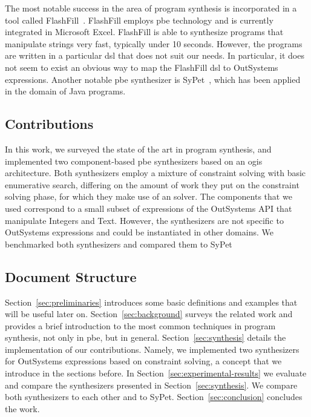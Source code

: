 The most notable success in the area of program synthesis is incorporated in a
tool called FlashFill~\cite{Gulwani:2011}.
FlashFill employs \gls{pbe} technology and is currently integrated in Microsoft
Excel.
FlashFill is able to synthesize programs that manipulate strings very fast,
typically under 10 seconds.
However, the programs are written in a particular \gls{dsl} that does not suit
our needs.
In particular, it does not seem to exist an obvious way to map the FlashFill
\gls{dsl} to OutSystems expressions.
Another notable \gls{pbe} synthesizer is SyPet~\cite{Feng:2017:CSC}, which has
been applied in the domain of Java programs.

\subsection{Contributions}

In this work, we surveyed the state of the art in program synthesis, and
implemented two component-based \gls{pbe} synthesizers based on an \gls{ogis}
architecture.
Both synthesizers employ a mixture of constraint solving with basic enumerative
search, differing on the amount of work they put on the constraint solving
phase, for which they make use of an  solver.
The components that we used correspond to a small subset of expressions of the
OutSystems API that manipulate Integers and Text.
However, the synthesizers are not specific to OutSystems expressions and could
be instantiated in other domains.
We benchmarked both synthesizers and compared them to SyPet~\cite{Feng:2017:CSC}

\subsection{Document Structure}
\label{sec:structure}

Section~\ref{sec:preliminaries} introduces some basic definitions and examples
that will be useful later on.
Section~\ref{sec:background} surveys the related work and provides a brief
introduction to the most common techniques in program synthesis, not only in
\gls{pbe}, but in general.
Section~\ref{sec:synthesis} details the implementation of our contributions.
Namely, we implemented two synthesizers for OutSystems expressions based on
constraint solving, a concept that we introduce in the sections before.
In Section~\ref{sec:experimental-results} we evaluate and compare the
synthesizers presented in Section~\ref{sec:synthesis}.
We compare both synthesizers to each other and to SyPet.
Section~\ref{sec:conclusion} concludes the work.
